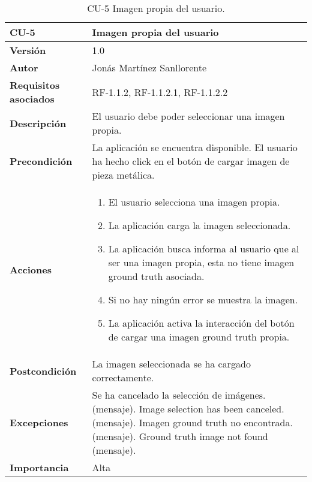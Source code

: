 \begin{table}[p]
	\centering
	\begin{tabularx}{\linewidth}{ p{} p{} }
		\toprule
		\textbf{CU-5}    & \textbf{Imagen propia del usuario}\\
		\toprule
		\textbf{Versión}              & 1.0    \\
		\textbf{Autor}                & Jonás Martínez Sanllorente \\
		\textbf{Requisitos asociados} & RF-1.1.2, RF-1.1.2.1, RF-1.1.2.2 \\
		\textbf{Descripción}          & El usuario debe poder seleccionar una imagen propia. \\
		\textbf{Precondición}         & La aplicación se encuentra disponible.\newline
                                        El usuario ha hecho click en el botón de cargar imagen de pieza metálica. \\
		\textbf{Acciones}             &
		\begin{enumerate}
			\def\labelenumi{\arabic{enumi}.}
			\tightlist
			\item El usuario selecciona una imagen propia.
			\item La aplicación carga la imagen seleccionada.
            \item La aplicación busca informa al usuario que al ser una imagen propia, esta no tiene imagen ground truth asociada.
            \item Si no hay ningún error se muestra la imagen.
            \item La aplicación activa la interacción del botón de cargar una imagen ground truth propia.
		\end{enumerate}\\
		\textbf{Postcondición}        & La imagen seleccionada se ha cargado correctamente. \\
		\textbf{Excepciones}          & Se ha cancelado la selección de imágenes. (mensaje).\newline
                                        Image selection has been canceled. (mensaje).\newline
                                        Imagen ground truth no encontrada. (mensaje).\newline
                                        Ground truth image not found (mensaje). \\
		\textbf{Importancia}          & Alta \\
		\bottomrule
	\end{tabularx}
	\caption{CU-5 Imagen propia del usuario.}
\end{table}

